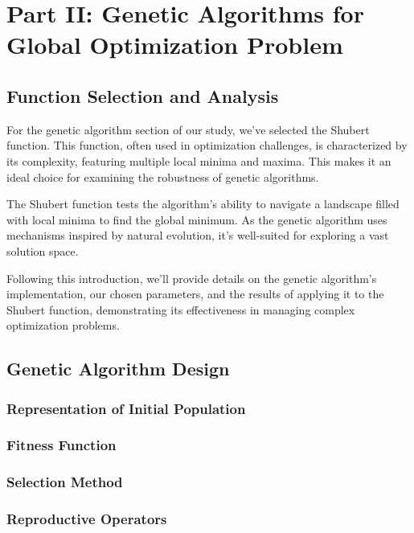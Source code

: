 \documentclass[conference]{inc/IEEEtran}
\begin{document}
\section{Part II: Genetic Algorithms for Global Optimization Problem}

\subsection{Function Selection and Analysis}

For the genetic algorithm section of our study, we've selected the Shubert function. This function, often used in optimization challenges, is characterized
by its complexity, featuring multiple local minima and maxima. This makes it an ideal choice for examining the robustness of genetic algorithms.

The Shubert function tests the algorithm's ability to navigate a landscape filled with local minima to find the global minimum. As the genetic algorithm
uses mechanisms inspired by natural evolution, it's well-suited for exploring a vast solution space.

Following this introduction, we'll provide details on the genetic algorithm's implementation, our chosen parameters, and the results of applying it to the
Shubert function, demonstrating its effectiveness in managing complex optimization problems.

\subsection{Genetic Algorithm Design}

\subsubsection{Representation of Initial Population}

\subsubsection{Fitness Function}

\subsubsection{Selection Method}

\subsubsection{Reproductive Operators}
\end{document}
